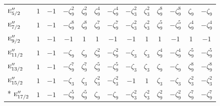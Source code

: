 \documentclass[10pt,a4paper]{article}
\numberwithin{equation}{section}
\newcommand{\irr}[1]{\text{\normalfont\scshape #1}}
\newcommand{\rootunity}[1]{\zeta_{#1}}
\begin{document}
{\begin{longtable}{@{}lcccccccccccc@{}}
$\irr{e}_{5/2}''$ & $1$ & $-1$ & $-\rootunity{9}^{2}$ & $\rootunity{9}^{2}$ & $\rootunity{9}^{4}$ & $-\rootunity{9}^{4}$ & $-\rootunity{3}^{2}$ & $\rootunity{3}^{2}$ & $\rootunity{9}^{8}$ & $-\rootunity{9}^{8}$ & $\rootunity{9}$ & $-\rootunity{9}$\\
$\irr{e}_{7/2}''$ & $1$ & $-1$ & $-\rootunity{9}^{8}$ & $\rootunity{9}^{8}$ & $\rootunity{9}^{7}$ & $-\rootunity{9}^{7}$ & $-\rootunity{3}^{2}$ & $\rootunity{3}^{2}$ & $\rootunity{9}^{5}$ & $-\rootunity{9}^{5}$ & $\rootunity{9}^{4}$ & $-\rootunity{9}^{4}$\\
$\irr{e}_{9/2}''$ & $1$ & $-1$ & $-1$ & $1$ & $1$ & $-1$ & $-1$ & $1$ & $1$ & $-1$ & $1$ & $-1$\\
$\irr{e}_{11/2}''$ & $1$ & $-1$ & $-\rootunity{9}$ & $\rootunity{9}$ & $\rootunity{9}^{2}$ & $-\rootunity{9}^{2}$ & $-\rootunity{3}$ & $\rootunity{3}$ & $\rootunity{9}^{4}$ & $-\rootunity{9}^{4}$ & $\rootunity{9}^{5}$ & $-\rootunity{9}^{5}$\\
$\irr{e}_{13/2}''$ & $1$ & $-1$ & $-\rootunity{9}^{7}$ & $\rootunity{9}^{7}$ & $\rootunity{9}^{5}$ & $-\rootunity{9}^{5}$ & $-\rootunity{3}$ & $\rootunity{3}$ & $\rootunity{9}$ & $-\rootunity{9}$ & $\rootunity{9}^{8}$ & $-\rootunity{9}^{8}$\\
$\irr{e}_{15/2}''$ & $1$ & $-1$ & $-\rootunity{3}$ & $\rootunity{3}$ & $\rootunity{3}^{2}$ & $-\rootunity{3}^{2}$ & $-1$ & $1$ & $\rootunity{3}$ & $-\rootunity{3}$ & $\rootunity{3}^{2}$ & $-\rootunity{3}^{2}$\\*
$\irr{e}_{17/2}''$ & $1$ & $-1$ & $-\rootunity{9}^{5}$ & $\rootunity{9}^{5}$ & $\rootunity{9}$ & $-\rootunity{9}$ & $-\rootunity{3}^{2}$ & $\rootunity{3}^{2}$ & $\rootunity{9}^{2}$ & $-\rootunity{9}^{2}$ & $\rootunity{9}^{7}$ & $-\rootunity{9}^{7}$\\
\bottomrule\end{longtable}}
\end{document}
